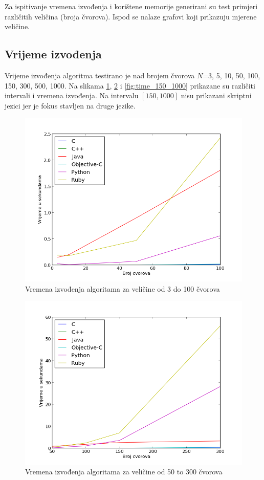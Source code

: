 \documentclass[times, utf8, seminar, numeric]{fer}
\begin{document}
Za ispitivanje vremena izvođenja i korištene memorije generirani su test primjeri različitih veličina (broja čvorova). Ispod se nalaze grafovi koji prikazuju mjerene veličine.

\subsection{Vrijeme izvođenja}

Vrijeme izvođenja algoritma testirano je nad brojem čvorova $N$=3, 5, 10, 50, 100, 150, 300, 500, 1000. Na slikama \ref{fig:time_100}, \ref{fig:time_50_300} i \ref{fig:time_150_1000} prikazane su različiti intervali i vremena izvođenja. Na intervalu $\left [ 150,1000 \right ]$ nisu prikazani skriptni jezici jer je fokus stavljen na druge jezike. 

\begin{figure}[!h]
\centering
\includegraphics[scale=0.6]{./img/Primjeri_do_100.png}
\caption{Vremena izvođenja algoritama za veličine od 3 do 100 čvorova}
\label{fig:time_100}
\end{figure}

\begin{figure}[!h]
\centering
\includegraphics[scale=0.6]{./img/Primjeri_50_300.png}
\caption{Vremena izvođenja algoritama za veličine od 50 to 300 čvorova}
\label{fig:time_50_300}
\end{figure}
\end{document}
